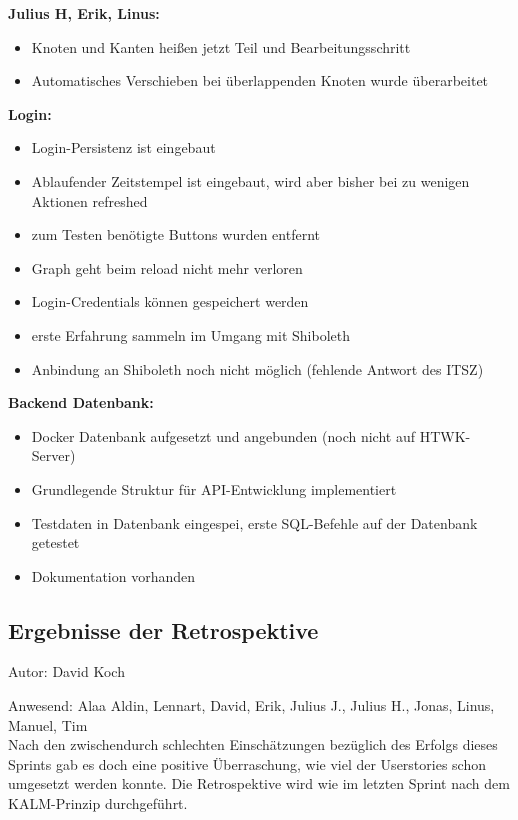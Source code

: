 \textbf{Julius H, Erik, Linus:}
\begin{itemize}
\item Knoten und Kanten heißen jetzt Teil und Bearbeitungsschritt
\item Automatisches Verschieben bei überlappenden Knoten wurde überarbeitet
\end{itemize}

\textbf{Login:}
\begin{itemize}
\item Login-Persistenz ist eingebaut
\item Ablaufender Zeitstempel ist eingebaut, wird aber bisher bei zu wenigen Aktionen refreshed
\item zum Testen benötigte Buttons wurden entfernt
\item Graph geht beim reload nicht mehr verloren
\item Login-Credentials können gespeichert werden
\item erste Erfahrung sammeln im Umgang mit Shiboleth
\item Anbindung an Shiboleth noch nicht möglich (fehlende Antwort des ITSZ)
\end{itemize}

\textbf{Backend Datenbank:}
\begin{itemize}
\item Docker Datenbank aufgesetzt und angebunden (noch nicht auf HTWK-Server)
\item Grundlegende Struktur für API-Entwicklung implementiert
\item Testdaten in Datenbank eingespei, erste SQL-Befehle auf der Datenbank getestet
\item Dokumentation vorhanden
\end{itemize}

\subsection{Ergebnisse der Retrospektive}
{\small Autor: David Koch}

Anwesend: Alaa Aldin, Lennart, David, Erik, Julius J., Julius H., Jonas, Linus, Manuel, Tim\\

Nach den zwischendurch schlechten Einschätzungen bezüglich des Erfolgs dieses Sprints gab es doch eine positive Überraschung, wie viel der Userstories schon umgesetzt werden konnte. Die Retrospektive wird wie im letzten Sprint nach dem KALM-Prinzip durchgeführt.


